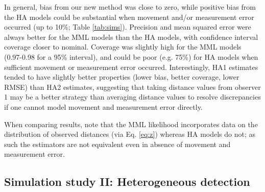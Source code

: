 \documentclass[aoas,preprint]{imsart}
\numberwithin{equation}{section}
\theoremstyle{plain}
\begin{document}
In general, bias from our new method was close to zero, while positive bias from the HA models could be substantial when movement and/or measurement error occurred (up to 10\%; Table \ref{tab:sims}).  Precision and mean squared error were always better for the MML models than the HA models, with confidence interval coverage closer to nominal. Coverage was slightly high for the MML models (0.97-0.98 for a 95\% interval), and could be poor (e.g. 75\%) for HA models when sufficient movement or measurement error occurred.  Interestingly, HA1 estimates tended to have slightly better properties (lower bias, better coverage, lower RMSE) than HA2 estimates, suggesting that taking distance values from observer 1 may be a better strategy than averaging distance values to resolve discrepancies if one cannot model movement and measurement error directly.

When comparing results, note that the MML likelihood incorporates data on the distribution of observed distances (via Eq. \ref{eq:z}) whereas HA models do not; as such the estimators are not equivalent even in absence of movement and measurement error.


\subsection{Simulation study II: Heterogeneous detection}
\end{document}
